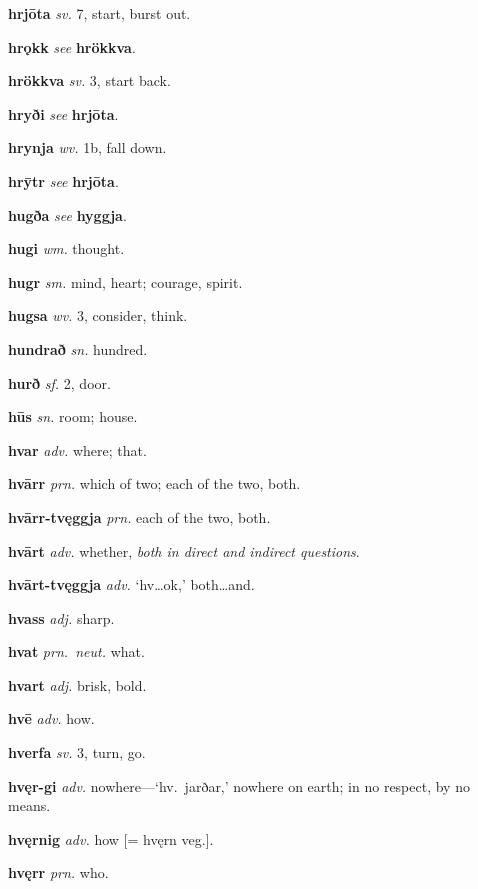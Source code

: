 \documentclass[12pt,letterpaper]{book}
\begin{document}
\noindent
\textbf{hrjōta} \textit{sv.} 7, start, burst out.

\noindent
\textbf{hrǫkk} \textit{} \textit{see} \textbf{hrökkva}.

\noindent
\textbf{hrökkva} \textit{sv.} 3, start back.

\noindent
\textbf{hryði} \textit{} \textit{see} \textbf{hrjōta}.

\noindent
\textbf{hrynja} \textit{wv.} 1b, fall down.

\noindent
\textbf{hrȳtr} \textit{} \textit{see} \textbf{hrjōta}.

\noindent
\textbf{hugða} \textit{} \textit{see} \textbf{hyggja}.

\noindent
\textbf{hugi} \textit{wm.} thought.

\noindent
\textbf{hugr} \textit{sm.} mind, heart; courage, spirit.

\noindent
\textbf{hugsa} \textit{wv.} 3, consider, think.

\noindent
\textbf{hundrað} \textit{sn.} hundred.

\noindent
\textbf{hurð} \textit{sf.} 2, door.

\noindent
\textbf{hūs} \textit{sn.} room; house.

\noindent
\textbf{hvar} \textit{adv.} where; that.

\noindent
\textbf{hvārr} \textit{prn.} which of two; each of the two, both.

\noindent
\textbf{hvārr-tvęggja} \textit{prn.} each of the two, both.

\noindent
\textbf{hvārt} \textit{adv.} whether, \textit{both in direct and indirect
	questions}.

\noindent
\textbf{hvārt-tvęggja} \textit{adv.} `hv\ldots ok,' both\ldots and.

\noindent
\textbf{hvass} \textit{adj.} sharp.

\noindent
\textbf{hvat} \textit{prn.\ neut.} what.

\noindent
\textbf{hvart} \textit{adj.} brisk, bold.

\noindent
\textbf{hvē} \textit{adv.} how.

\noindent
\textbf{hverfa} \textit{sv.} 3, turn, go.

\noindent
\textbf{hvęr-gi} \textit{adv.} nowhere---`hv.\ jarðar,' nowhere on
	earth; in no respect, by no means.

\noindent
\textbf{hvęrnig} \textit{adv.} how [= hvęrn veg.].

\noindent
\textbf{hvęrr} \textit{prn.} who.
\end{document}

